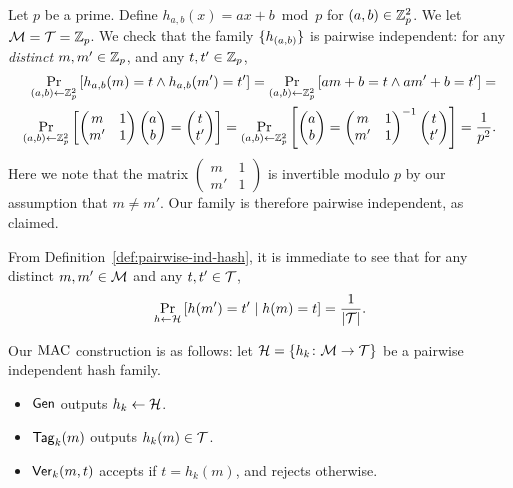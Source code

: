 \documentclass[11pt]{article}
\begin{document}
\begin{example} 
  \label{ex:pairwise-ind}
  Let $p$ be a prime.  Define $h_{a,b}(x) = ax + b \bmod p$ for $(a,b)
  \in \mathbb{Z}_p^2$.  We let $\mathcal{M} = \mathcal{T} = \mathbb{Z}_p$.  We check that
  the family $\{h_{(a,b)}\}$ is pairwise independent: for any
  \emph{distinct} $m,m' \in \mathbb{Z}_p$, and any $t,t' \in \mathbb{Z}_p$,
  \begin{align*}
    \Pr_{(a,b) \gets \mathbb{Z}_p^2}\left[h_{a,b}(m) = t \wedge h_{a,b}(m') =
      t'\right] =
    \Pr_{(a,b) \gets \mathbb{Z}_p^2}\left[am+b = t \wedge am'+b = t'\right] = \\
    \Pr_{(a,b) \gets \mathbb{Z}_p^2}\left[
      \begin{pmatrix} m & 1 \\ m ' & 1 \end{pmatrix}
      \begin{pmatrix} a \\ b \end{pmatrix} =
      \begin{pmatrix} t \\ t' \end{pmatrix} \right] = \Pr_{(a,b) \gets
      \mathbb{Z}_p^2}\left[ \begin{pmatrix} a \\ b \end{pmatrix} =
      \begin{pmatrix} m & 1 \\ m ' & 1 \end{pmatrix}^{-1}
      \begin{pmatrix} t \\ t' \end{pmatrix} \right] = \frac{1}{p^2}.
  \end{align*}
  Here we note that the matrix $\left( \begin{smallmatrix} m & 1 \\ m
      ' & 1 \end{smallmatrix} \right)$ is invertible modulo $p$ by our
  assumption that $m \neq m'$.  Our family is therefore pairwise
  independent, as claimed.
\end{example}

From Definition~\ref{def:pairwise-ind-hash}, it is immediate to see
that for any distinct $m,m' \in \mathcal{M}$ and any $t,t' \in
\mathcal{T}$, \[ \Pr_{h \gets \mathcal{H}}\left[h(m')=t' \mid h(m)=t\right] =
\frac{1}{\lvert\mathcal{T}\rvert}. \]

\noindent
Our $\text{MAC}$ construction is as follows: let $\mathcal{H} = \{h_k \colon
  \mathcal{M} \to \mathcal{T}\}$ be a pairwise independent hash family.
\begin{itemize}
\item $\mathsf{Gen}$ outputs $h_{k} \gets \mathcal{H}$.
\item $\mathsf{Tag}_k(m)$ outputs $h_{k}(m) \in \mathcal{T}$.
\item $\mathsf{Ver}_k(m, t)$ accepts if $t = h_k(m)$, and rejects otherwise.
\end{itemize}
\end{document}
